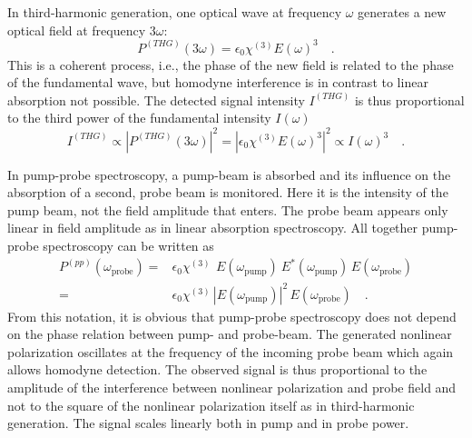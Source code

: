 In third-harmonic generation, one optical wave at frequency $\omega$ generates a new optical field at frequency $3 \omega$: 
%
\begin{equation}
P^{(THG)}(3 \omega) = \epsilon_0 \chi^{(3)} E(\omega)^3  \quad .
\label{eq:fwm_chi3-thg}
\end{equation}
%
This is a coherent process, i.e., the phase of the new field is related to the phase of the fundamental wave, but homodyne interference is in contrast to linear absorption not possible. The detected signal intensity $I^{(THG)}$ is thus proportional to the third power of the fundamental intensity $I(\omega)$
\begin{equation}
I^{(THG)} \propto \left| P^{(THG)}(3 \omega) \right|^2 = \left| \epsilon_0 \chi^{(3)} E(\omega)^3 \right|^2 \propto I(\omega)^3 \quad .
\label{eq:fwm_intensity-thg}
\end{equation}


In pump-probe spectroscopy, a pump-beam is absorbed and its influence on the absorption of a second, probe beam is monitored. Here it is the intensity of the pump beam, not the field amplitude that enters. The probe beam appears only linear in field amplitude as in linear absorption spectroscopy.
All together pump-probe spectroscopy can be written as
%
\begin{align}
P^{(pp)}(\omega_{\text{probe}}) = &
\epsilon_0 \chi^{(3)} \, \ E(\omega_{\text{pump}}) \ E^*(\omega_{\text{pump}})  \, E(\omega_{\text{probe}})  \nonumber \\
= &
\epsilon_0 \chi^{(3)} \, \left| E(\omega_{\text{pump}})  \right|^2 \, E(\omega_{\text{probe}})  
\quad .
\label{eq:fwm_chi3-pp}
\end{align}
%
From this notation, it is obvious that pump-probe spectroscopy does not depend on the phase relation between pump- and probe-beam.
The generated nonlinear polarization oscillates at the frequency of the incoming probe beam which again allows homodyne detection. The observed signal is thus proportional to the amplitude of the interference between nonlinear polarization and probe field and not to the square of the nonlinear polarization itself as in third-harmonic generation. The  signal  scales linearly both  in pump and in probe power.


